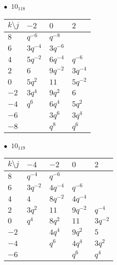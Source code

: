 \begin{minipage}{\linewidth}
$\bullet\ $ $10_{118}$ \vspace{0.5em} \\
\begin{tabular}{l|lll}
$k \setminus j$ & $-2$ & $0$ & $2$ \\
\hline
$8$ & $q^{-6}$ & $q^{-8}$ &  \\
$6$ & $3q^{-4}$ & $3q^{-6}$ &  \\
$4$ & $5q^{-2}$ & $6q^{-4}$ & $q^{-6}$ \\
$2$ & $6$ & $9q^{-2}$ & $3q^{-4}$ \\
$0$ & $5q^{2}$ & $11$ & $5q^{-2}$ \\
$-2$ & $3q^{4}$ & $9q^{2}$ & $6$ \\
$-4$ & $q^{6}$ & $6q^{4}$ & $5q^{2}$ \\
$-6$ &  & $3q^{6}$ & $3q^{4}$ \\
$-8$ &  & $q^{8}$ & $q^{6}$ \\
\end{tabular}
\vspace{2em}
\end{minipage}
%
\begin{minipage}{\linewidth}
$\bullet\ $ $10_{119}$ \vspace{0.5em} \\
\begin{tabular}{l|llll}
$k \setminus j$ & $-4$ & $-2$ & $0$ & $2$ \\
\hline
$8$ & $q^{-4}$ & $q^{-6}$ &  &  \\
$6$ & $3q^{-2}$ & $4q^{-4}$ & $q^{-6}$ &  \\
$4$ & $4$ & $8q^{-2}$ & $4q^{-4}$ &  \\
$2$ & $3q^{2}$ & $11$ & $9q^{-2}$ & $q^{-4}$ \\
$0$ & $q^{4}$ & $8q^{2}$ & $11$ & $3q^{-2}$ \\
$-2$ &  & $4q^{4}$ & $9q^{2}$ & $5$ \\
$-4$ &  & $q^{6}$ & $4q^{4}$ & $3q^{2}$ \\
$-6$ &  &  & $q^{6}$ & $q^{4}$ \\
\end{tabular}
\vspace{2em}
\end{minipage}
%

